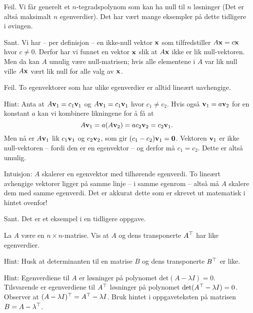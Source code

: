 \begin{losning}

\begin{punkt}
Feil. Vi får generelt et $n$-tegradspolynom som kan ha null til $n$ løsninger (Det er altså maksimalt $n$ egenverdier). Det har vært mange eksempler på dette tidligere i øvingen.
\end{punkt}

\begin{punkt}
Sant. Vi har -- per definisjon -- en ikke-null vektor $\mathbf{x}$ som tilfredstiller $A\mathbf{x}=c\mathbf{x}$ hvor $c\neq 0$. Derfor har vi funnet en vektor $\mathbf{x}$ slik at $A\mathbf{x}$ ikke er lik null-vektoren. Men da kan $A$ umulig være null-matrisen; hvis alle elementene i $A$ var lik null ville $A\mathbf{x}$ vært lik null for alle valg av $\mathbf{x}$.
\end{punkt}

\begin{punkt}
Feil. To egenvektorer som har ulike egenverdier er alltid lineært uavhengige. 

\noindent
Hint: Anta at $A\mathbf{v}_1=c_1\mathbf{v}_1$ og $A\mathbf{v}_1=c_1\mathbf{v}_1$ hvor $c_1\neq c_2$. Hvis også $\mathbf{v}_1=a\mathbf{v}_2$ for en konstant $a$ kan vi kombinere likningene for å få at $$A\mathbf{v}_1=a(A\mathbf{v}_2)=ac_2\mathbf{v}_2=c_2\mathbf{v}_1.$$ Men nå er $A\mathbf{v}_1$ lik $c_1\mathbf{v}_1$ og $c_2\mathbf{v}_2$, som gir $(c_1-c_2)\mathbf{v}_1=\mathbf{0}$. Vektoren $\mathbf{v}_1$ er ikke null-vektoren -- fordi den er en egenvektor -- og derfor må $c_1=c_2$. Dette er altså umulig.

\noindent
Intuisjon: $A$ skalerer en egenvektor med tilhørende egenverdi. To lineært avhengige vektorer ligger på samme linje -- i samme egenrom -- altså må $A$ skalere dem med samme egenverdi. Det er akkurat dette som er skrevet ut matematisk i hintet ovenfor!
\end{punkt}

\begin{punkt}
Sant. Det er et eksempel i en tidligere oppgave.
\end{punkt}

\end{losning}

\begin{oppgave}
La $A$ være en $n\times n$-matrise. Vis at $A$ og dens transponerte $A^\top$ har like egenverdier.

\noindent
Hint: Husk at determinanten til en matrise $B$ og dens transponerte $B^\top$ er like.
\end{oppgave}

\begin{losning}
Hint: Egenverdiene til $A$ er løsninger på polynomet $\text{det}(A-\lambda I)=0$. Tilsvarende er egenverdiene til $A^\top$ løsninger på polynomet $\text{det}(A^\top-\lambda I)=0$. Observer at $(A-\lambda I)^\top=A^\top-\lambda I$. Bruk hintet i oppgaveteksten på matrisen $B=A-\lambda^\top$.
\end{losning}
